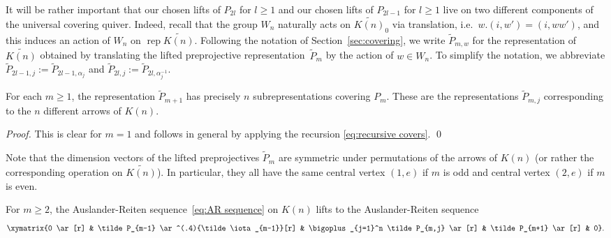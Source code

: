 \documentclass[smallextended,envcountsect,envcountsame]{svjour3}
\numberwithin{equation}{section}
\newcommand{\rep}{\operatorname{rep}}
\begin{document}
It will be rather important that our chosen lifts of $P_{2l}$ for $l\ge1$ and our chosen lifts of $P_{2l-1}$ for $l\ge1$ live on two different components of the universal covering quiver.
Indeed, recall that the group $W_n$ naturally acts on $\widetilde{K(n)}_0$ via translation, i.e.~$w.(i,w')=(i,ww')$, and this induces an action of $W_n$ on $\rep\widetilde{K(n)}$.
Following the notation of Section~\ref{sec:covering}, we write $\tilde P_{m,w}$ for the representation of $\widetilde{K(n)}$ obtained by translating the lifted preprojective representation~$\tilde P_m$ by the action of $w\in W_n$.
To simplify the notation, we abbreviate $\tilde P_{2l-1,j}:=\tilde P_{2l-1,\alpha_j}$ and $\tilde P_{2l,j}:=\tilde P_{2l,\alpha_j^{-1}}$.
\begin{lemma}
  \label{le:shifted subreps}
  For each $m\ge1$, the representation $\tilde P_{m+1}$ has precisely $n$ subrepresentations covering $P_m$.
  These are the representations $\tilde P_{m,j}$ corresponding to the $n$ different arrows of $K(n)$. 
\end{lemma}
\begin{proof}
  This is clear for $m=1$ and follows in general by applying the recursion \eqref{eq:recursive covers}.
\qed\end{proof}
\begin{remark}
  Note that the dimension vectors of the lifted preprojectives $\tilde P_m$ are symmetric under permutations of the arrows of $K(n)$ (or rather the corresponding operation on $\widetilde{K(n)}$).
  In particular, they all have the same central vertex $(1,e)$ if $m$ is odd and central vertex $(2,e)$ if $m$ is even.
\end{remark}

\begin{corollary}
  \label{cor:AR lift}
  For $m\ge2$, the Auslander-Reiten sequence~\eqref{eq:AR sequence} on $K(n)$ lifts to the Auslander-Reiten sequence
  \begin{equation}
    \label{eq:lifted AR sequence}
    \xymatrix{0 \ar[r] & \tilde P_{m-1} \ar^(.4){\tilde\iota_{m-1}}[r] & \bigoplus_{j=1}^n \tilde P_{m,j} \ar[r] & \tilde P_{m+1} \ar[r] & 0}.
  \end{equation}
\end{corollary} 
\end{document}
